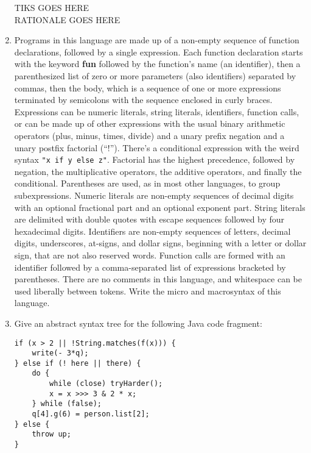 \documentclass{article}
\begin{document}
\begin{enumerate}
TIKS GOES HERE \\
RATIONALE GOES HERE \\
\pagebreak
\item Programs in this language are made up of a non-empty sequence of function declarations, followed by a single expression. Each function declaration starts with the keyword \textbf{fun} followed by the function's name (an identifier), then a parenthesized list of zero or more parameters (also identifiers) separated by commas, then the body, which is a sequence of one or more expressions terminated by semicolons with the sequence enclosed in curly braces. Expressions can be numeric literals, string literals, identifiers, function calls, or can be made up of other expressions with the usual binary arithmetic operators (plus, minus, times, divide) and a unary prefix negation and a unary postfix factorial (``!''). There's a conditional expression with the weird syntax \texttt{"x if y else z"}. Factorial has the highest precedence, followed by negation, the multiplicative operators, the additive operators, and finally the conditional. Parentheses are used, as in most other languages, to group subexpressions. Numeric literals are non-empty sequences of decimal digits with an optional fractional part and an optional exponent part.
String literals are delimited with double quotes with escape sequences followed by four hexadecimal digits. Identifiers are non-empty sequences of letters, decimal digits, underscores, at-signs, and dollar signs, beginning with a letter or dollar sign, that are not also reserved words. Function calls are formed with an identifier followed by a comma-separated list of expressions bracketed by parentheses. There are no comments in this language, and whitespace can be used liberally between tokens.
Write the micro and macrosyntax of this language.

\pagebreak
\item Give an abstract syntax tree for the following Java code fragment:
\begin{verbatim}
if (x > 2 || !String.matches(f(x))) {
    write(- 3*q);
} else if (! here || there) {
    do {
        while (close) tryHarder();
        x = x >>> 3 & 2 * x;
    } while (false);
    q[4].g(6) = person.list[2];
} else {
    throw up;
}
\end{verbatim}
\pagebreak
\end{enumerate}
\end{document}
